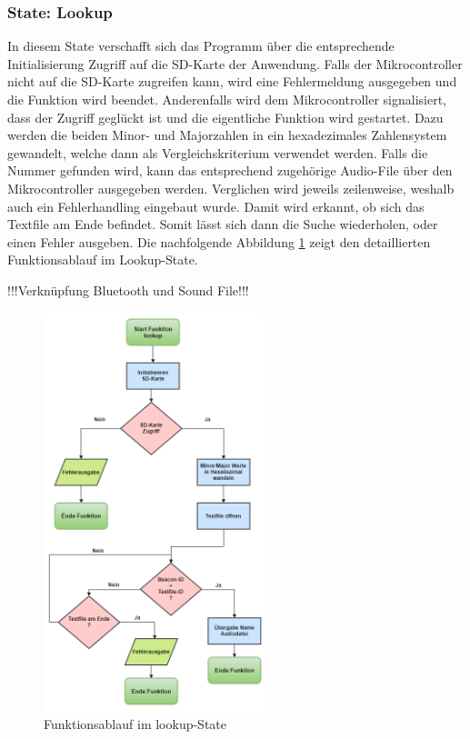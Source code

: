 \subsubsection*{State: Lookup}
In diesem State verschafft sich das Programm über die entsprechende Initialisierung Zugriff auf die SD-Karte der Anwendung. Falls der Mikrocontroller nicht auf die SD-Karte zugreifen kann, wird eine Fehlermeldung ausgegeben und die Funktion wird beendet. Anderenfalls wird dem Mikrocontroller signalisiert, dass der Zugriff geglückt ist und die eigentliche Funktion wird gestartet. Dazu werden die beiden Minor- und Majorzahlen in ein hexadezimales Zahlensystem gewandelt, welche dann als Vergleichskriterium verwendet werden. Falls die Nummer gefunden wird, kann das entsprechend zugehörige Audio-File über den Mikrocontroller ausgegeben werden. Verglichen wird jeweils zeilenweise, weshalb auch ein Fehlerhandling eingebaut wurde. Damit wird erkannt, ob sich das Textfile am Ende befindet. Somit lässt sich dann die Suche wiederholen, oder einen Fehler ausgeben. Die nachfolgende Abbildung \ref{fig:lookupState} zeigt den detaillierten Funktionsablauf im Lookup-State.

!!!Verknüpfung Bluetooth und Sound File!!!

\begin{figure}[htbp!!!!]
	\centering
	\includegraphics[width=0.57\textwidth]{Data/lookup_picture}
	\caption[Statemachine: lookup]{Funktionsablauf im lookup-State}
	\label{fig:lookupState}
\end{figure} 

